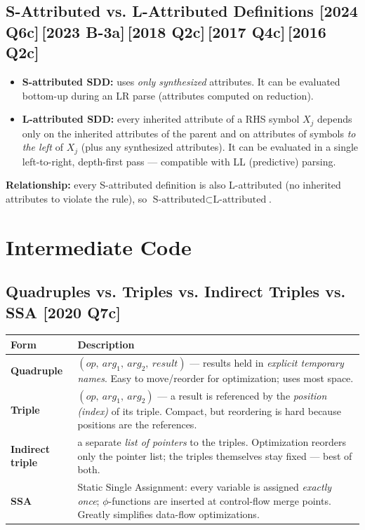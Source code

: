\documentclass[12pt, a4paper]{article}
\newenvironment{qbox}{\begin{mdframed}[style=qframe]}{\end{mdframed}}
\newcommand{\yr}[1]{{\small\color{accent}\textbf{[#1]}}}
\newcommand{\term}[1]{\textbf{\color{keyblue}#1}}
\begin{document}
\subsection{S-Attributed vs. L-Attributed Definitions \yr{2024 Q6c}\,\yr{2023 B-3a}\,\yr{2018 Q2c}\,\yr{2017 Q4c}\,\yr{2016 Q2c}}
\begin{qbox}
\begin{itemize}
\item \term{S-attributed SDD:} uses \emph{only synthesized} attributes. It can be evaluated bottom-up during an LR parse
(attributes computed on reduction).
\item \term{L-attributed SDD:} every inherited attribute of a RHS symbol $X_j$ depends only on the inherited attributes
of the parent and on attributes of symbols \emph{to the left} of $X_j$ (plus any synthesized attributes). It can be
evaluated in a single left-to-right, depth-first pass — compatible with LL (predictive) parsing.
\end{itemize}
\textbf{Relationship:} every S-attributed definition is also L-attributed (no inherited attributes to violate the rule), so $\text{S-attributed}\subset\text{L-attributed}$.
\end{qbox}

\section{Intermediate Code}

\subsection{Quadruples vs. Triples vs. Indirect Triples vs. SSA \yr{2020 Q7c}}
\begin{qbox}
\begin{tabularx}{\linewidth}{@{}l Y@{}}
\toprule
\textbf{Form} & \textbf{Description}\\
\midrule
\term{Quadruple} & \((op,\ arg_1,\ arg_2,\ result)\) — results held in \emph{explicit temporary names}. Easy to move/reorder for optimization; uses most space.\\
\term{Triple} & \((op,\ arg_1,\ arg_2)\) — a result is referenced by the \emph{position (index)} of its triple. Compact, but reordering is hard because positions are the references.\\
\term{Indirect triple} & a separate \emph{list of pointers} to the triples. Optimization reorders only the pointer list; the triples themselves stay fixed — best of both.\\
\term{SSA} & Static Single Assignment: every variable is assigned \emph{exactly once}; \(\phi\)-functions are inserted at control-flow merge points. Greatly simplifies data-flow optimizations.\\
\bottomrule
\end{tabularx}
\end{qbox}
\end{document}
